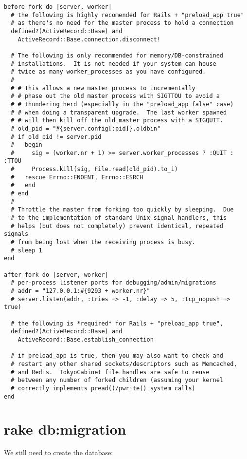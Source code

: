 \documentclass[a4paper]{book}
\newcounter{tab}[chapter]
\begin{document}
\begin{shaded}
\begin{verbatim}
before_fork do |server, worker|
  # the following is highly recomended for Rails + "preload_app true"
  # as there's no need for the master process to hold a connection
  defined?(ActiveRecord::Base) and
    ActiveRecord::Base.connection.disconnect!

  # The following is only recommended for memory/DB-constrained
  # installations.  It is not needed if your system can house
  # twice as many worker_processes as you have configured.
  #
  # # This allows a new master process to incrementally
  # # phase out the old master process with SIGTTOU to avoid a
  # # thundering herd (especially in the "preload_app false" case)
  # # when doing a transparent upgrade.  The last worker spawned
  # # will then kill off the old master process with a SIGQUIT.
  # old_pid = "#{server.config[:pid]}.oldbin"
  # if old_pid != server.pid
  #   begin
  #     sig = (worker.nr + 1) >= server.worker_processes ? :QUIT : :TTOU
  #     Process.kill(sig, File.read(old_pid).to_i)
  #   rescue Errno::ENOENT, Errno::ESRCH
  #   end
  # end
  #
  # Throttle the master from forking too quickly by sleeping.  Due
  # to the implementation of standard Unix signal handlers, this
  # helps (but does not completely) prevent identical, repeated signals
  # from being lost when the receiving process is busy.
  # sleep 1
end

after_fork do |server, worker|
  # per-process listener ports for debugging/admin/migrations
  # addr = "127.0.0.1:#{9293 + worker.nr}"
  # server.listen(addr, :tries => -1, :delay => 5, :tcp_nopush => true)

  # the following is *required* for Rails + "preload_app true",
  defined?(ActiveRecord::Base) and
    ActiveRecord::Base.establish_connection

  # if preload_app is true, then you may also want to check and
  # restart any other shared sockets/descriptors such as Memcached,
  # and Redis.  TokyoCabinet file handles are safe to reuse
  # between any number of forked children (assuming your kernel
  # correctly implements pread()/pwrite() system calls)
end
\end{verbatim}\end{shaded}

\section{rake db:migration}\label{rake-dbmigration}

We still need to create the database:
\end{document}
